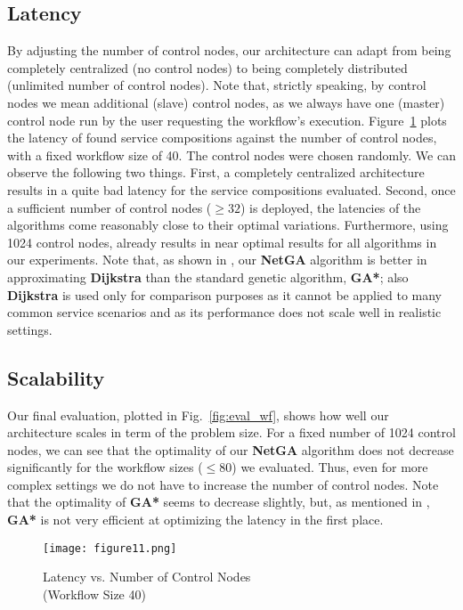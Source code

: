 \documentclass[10pt, conference, compsocconf]{IEEEtran}
\newcommand{\oneImage}{3.2in}
\begin{document}
\subsection{Latency}
\noindent By adjusting the number of control nodes,
	our architecture can adapt from being completely centralized (no control nodes)
		to being completely distributed (unlimited number of control nodes).
Note that, strictly speaking, by control nodes we mean additional (slave) control nodes,
	as we always have one (master) control node run by the user requesting the workflow's execution.
Figure~\ref{fig:eval_lat} plots the latency of found service compositions against the number of control nodes,
	with a fixed workflow size of 40.
The control nodes were chosen randomly.
We can observe the following two things.
First, a completely centralized architecture results in a quite bad latency for the service compositions evaluated.
Second, once a sufficient number of control nodes ($\geq 32$) is deployed,
	the latencies of the algorithms come reasonably close to their optimal variations.
Furthermore,
	using 1024 control nodes, already results in near optimal results for all algorithms in our experiments.
Note that, as shown in \cite{Klein2012}, our \textbf{NetGA} algorithm is better in approximating \textbf{Dijkstra} than the standard genetic algorithm, \textbf{GA*};
	also \textbf{Dijkstra} is used only for comparison purposes as it cannot be applied to many common service scenarios
		and as its performance does not scale well in realistic settings.
    
\subsection{Scalability}
\noindent Our final evaluation, plotted in Fig.~\ref{fig:eval_wf}, shows how well our architecture scales in term of the problem size.
For a fixed number of 1024 control nodes,
	we can see that the optimality of our \textbf{NetGA} algorithm does not decrease significantly for the workflow sizes ($\leq 80$) we evaluated.
Thus, even for more complex settings we do not have to increase the number of control nodes.
Note that the optimality of \textbf{GA*} seems to decrease slightly,
	but, as mentioned in \cite{Klein2012}, \textbf{GA*} is not very efficient at optimizing the latency in the first place.

\begin{figure}[t]
	\centering
	\texttt{[image: figure11.png]}
	\caption{Latency vs. Number of Control Nodes\\(Workflow Size 40)}
	\label{fig:eval_lat}
\end{figure}
\end{document}
